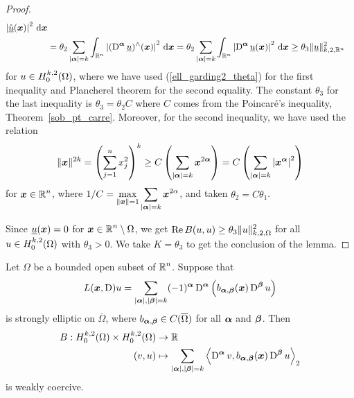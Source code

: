 \begin{proof}
\begin{align*}
\left| \hat{\underline{u}}({\bm{x}}) \right|^2 \,\mathrm{d}{{\bm{x}}} \\
&= \theta_2 \sum_{|{\bm{\alpha}}|=k} \int_{\mathbb{R}^n} \left|
(\operatorname{D}^{{\bm{\alpha}}} \underline{u})^\wedge ({\bm{x}}) \right|^2 \,\mathrm{d}{{\bm{x}}} 
= \theta_2 \sum_{|{\bm{\alpha}}|=k} \int_{\mathbb{R}^n}
\left| \operatorname{D}^{{\bm{\alpha}}} \underline{u}({\bm{x}}) \right|^2 \,\mathrm{d}{{\bm{x}}}
\geq \theta_3 \| \underline{u} \|_{k,2,\mathbb{R}^n}^2             
\end{align*}
for $\displaystyle u \in H^{k,2}_0(\Omega)$, where
we have used (\ref{ell_garding2_theta}) for the first inequality and
Plancherel theorem for the second equality.  The constant $\theta_3$
for the last inequality is $\theta_3 = \theta_2 C$ where $C$ comes
from the Poincaré's inequality, Theorem~\ref{sob_pt_carre}.
Moreover, for the second inequality, we have used the relation
\[
\| {\bm{x}} \|^{2k} = \left( \sum_{j=1}^n x_j^2 \right)^{k}
\geq C \left( \sum_{|{\bm{\alpha}}|=k} {\bm{x}}^{2{\bm{\alpha}}} \right)
= C \left( \sum_{|{\bm{\alpha}}|=k} \left|{\bm{x}}^{{\bm{\alpha}}}\right|^2 \right)
\]
for $\displaystyle {\bm{x}} \in \mathbb{R}^n$,
where $\displaystyle 1/C = \max_{\|{\bm{x}}\|=1}
\sum_{|{\bm{\alpha}}|=k} {\bm{x}}^{2\alpha}$,
and taken $\theta_2 = C \theta_1$.

Since $\underline{u}({\bm{x}}) = 0$ for
$\displaystyle {\bm{x}} \in \mathbb{R}^n \setminus \Omega$, we get
$\displaystyle \operatorname{Re} B(u,u) \geq \theta_3 \|u\|_{k,2,\Omega}^2$ for all
$\displaystyle u \in H^{k,2}_0(\Omega)$ with $\theta_3>0$.  We take
$K=\theta_3$ to get the conclusion of the lemma.
\end{proof}

\begin{lemma} \label{ell_garding3}
Let $\Omega$ be a bounded open subset of $\displaystyle \mathbb{R}^n$.  Suppose that
\[
L({\bm{x}},\operatorname{D})u = \sum_{|{\bm{\alpha}}|,|{\bm{\beta}}|= k}
(-1)^{{\bm{\alpha}}} \operatorname{D}^{{\bm{\alpha}}}
\left( b_{{\bm{\alpha}},{\bm{\beta}}}({\bm{x}}) \operatorname{D}^{{\bm{\beta}}} u\right)
\]
is strongly elliptic on $\overline{\Omega}$, where
$b_{{\bm{\alpha}},{\bm{\beta}}} \in C(\overline{\Omega})$ for all
${\bm{\alpha}}$ and ${\bm{\beta}}$.  Then
\[
\begin{split}
B : H^{k,2}_0(\Omega) \times H^{k,2}_0(\Omega) & \rightarrow \mathbb{R} \\
(v,u) &\mapsto
\sum_{|{\bm{\alpha}}|,|{\bm{\beta}}|= k}
\left\langle{\operatorname{D}^{{\bm{\alpha}}} v} , {b_{{\bm{\alpha}},{\bm{\beta}}}({\bm{x}})
\operatorname{D}^{{\bm{\beta}}} u}\right\rangle_2
\end{split}
\]
is weakly coercive.
\end{lemma}

